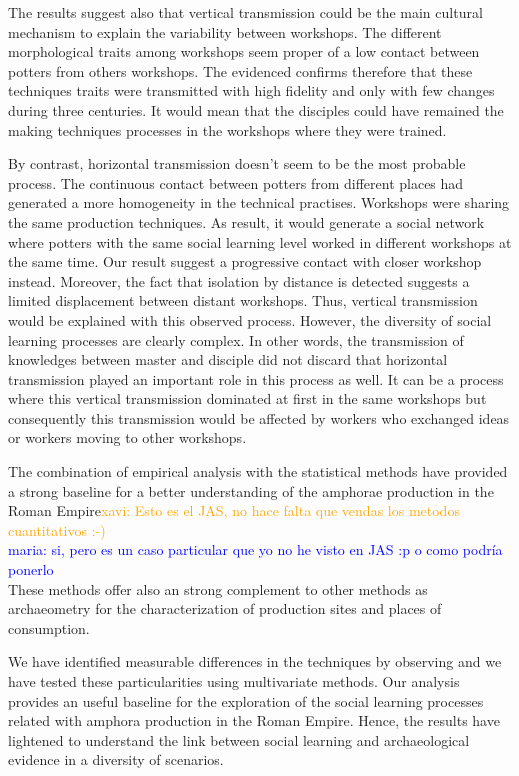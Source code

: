 \documentclass[review]{elsarticle}
\newcommand{\memo}[2]{\textcolor{#1}{#2}}
\newcommand{\xavi}[1]{\memo{orange}{xavi: #1\\}}
\newcommand{\maria}[1]{\memo{blue}{maria: #1\\}}
\begin{document}
The results suggest also that vertical transmission could be the main cultural mechanism to explain the variability between workshops. The different morphological traits among workshops seem proper of a low contact between potters from others workshops. The evidenced confirms therefore that these techniques traits were transmitted with high fidelity and only with few changes during three centuries. It would mean that the disciples could have remained the making techniques processes in the workshops where they were trained.  

By contrast, horizontal transmission doesn't seem to be the most probable process. The continuous contact between potters from different places had generated a more homogeneity in the technical practises. Workshops were sharing the same production techniques. As result, it would generate a social network where potters with the same social learning level worked in different workshops at the same time. Our result suggest a progressive contact with closer workshop instead. Moreover, the fact that isolation by distance is detected suggests a limited displacement between distant workshops. Thus, vertical transmission would be explained with this observed process. However, the diversity of social learning processes are clearly complex. In other words, the transmission of knowledges between master and disciple did not discard that horizontal transmission played an important role in this process as well. It can be a process where this vertical transmission dominated at first in the same workshops but consequently this transmission would be affected by workers who exchanged ideas or workers moving to other workshops.  

The combination of empirical analysis with the statistical methods have provided a strong baseline for a better understanding of the amphorae production in the Roman Empire\xavi{Esto es el JAS, no hace falta que vendas los metodos cuantitativos :-)}
\maria{si, pero es un caso particular que yo no he visto en JAS :p o como podría ponerlo} These methods offer also an strong complement to other methods as archaeometry for the characterization of production sites and places of consumption.  

We have identified measurable differences in the techniques by observing and we have tested these particularities using multivariate methods. Our analysis provides an useful baseline for the exploration of the social learning processes related with amphora production in the Roman Empire. Hence, the results have lightened to understand the link between social learning and archaeological evidence in a diversity of scenarios. 
\end{document}
